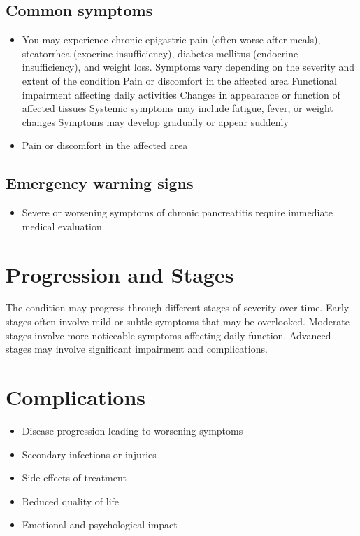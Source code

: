 \subsection{Common symptoms}
\begin{itemize}[noitemsep]
  \item You may experience chronic epigastric pain (often worse after meals), steatorrhea (exocrine insufficiency), diabetes mellitus (endocrine insufficiency), and weight loss. Symptoms vary depending on the severity and extent of the condition Pain or discomfort in the affected area Functional impairment affecting daily activities Changes in appearance or function of affected tissues Systemic symptoms may include fatigue, fever, or weight changes Symptoms may develop gradually or appear suddenly
  \item Pain or discomfort in the affected area
  \end{itemize}

\subsection{Emergency warning signs}
\begin{itemize}[noitemsep]
  \item Severe or worsening symptoms of chronic pancreatitis require immediate medical evaluation
\end{itemize}
\section{Progression and Stages}
The condition may progress through different stages of severity over time. Early stages often involve mild or subtle symptoms that may be overlooked. Moderate stages involve more noticeable symptoms affecting daily function. Advanced stages may involve significant impairment and complications.
\section{Complications}
\begin{itemize}[noitemsep]
  \item Disease progression leading to worsening symptoms
  \item Secondary infections or injuries
  \item Side effects of treatment
  \item Reduced quality of life
  \item Emotional and psychological impact
\end{itemize}
